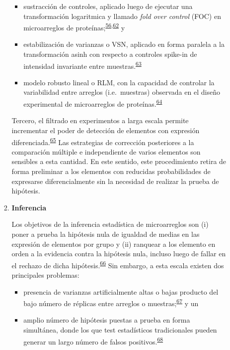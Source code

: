 \documentclass[]{article}
\providecommand{\tightlist}{%
  \setlength{\itemsep}{0pt}\setlength{\parskip}{0pt}}
\begin{document}
\begin{enumerate}
\begin{enumerate}
\begin{enumerate}
      \begin{itemize}
      \tightlist
      \item
        sustracción de controles, aplicado luego de ejecutar una
        transformación logaritmica y llamado \emph{fold over control}
        (FOC) en microarreglos de
        proteínas;\textsuperscript{\protect\hyperlink{ref-King2015FOC}{56},\protect\hyperlink{ref-arevalo2016}{62}}
        y
      \item
        estabilización de varianzas o VSN, aplicado en forma paralela a
        la transformación asinh con respecto a controles spike-in de
        intensidad invariante entre
        muestras.\textsuperscript{\protect\hyperlink{ref-huber2002vsn}{63}}
      \item
        modelo robusto lineal o RLM, con la capacidad de controlar la
        variabilidad entre arreglos (i.e.~muestras) observada en el
        diseño experimental de microarreglos de
        proteínas.\textsuperscript{\protect\hyperlink{ref-sboner2009rlm}{64}}
      \end{itemize}

      Tercero, el filtrado en experimentos a larga escala permite
      incrementar el poder de detección de elementos con expresión
      diferenciada.\textsuperscript{\protect\hyperlink{ref-bourgon2010filter}{65}}
      Las estrategias de corrección posteriores a la comparación
      múltiple e independiente de varios elementos son sensibles a esta
      cantidad. En este sentido, este procedimiento retira de forma
      preliminar a los elementos con reducidas probabilidades de
      expresarse diferencialmente sin la necesidad de realizar la prueba
      de hipótesis.
    \item
      \textbf{Inferencia}

      Los objetivos de la inferencia estadística de microarreglos son
      (i) poner a prueba la hipótesis nula de igualdad de medias en las
      expresión de elementos por grupo y (ii) ranquear a los elemento en
      orden a la evidencia contra la hipótesis nula, incluso luego de
      fallar en el rechazo de dicha
      hipótesis.\textsuperscript{\protect\hyperlink{ref-smyth2004ebayes}{66}}
      Sin embargo, a esta escala existen dos principales problemas:

      \begin{itemize}
      \tightlist
      \item
        presencia de varianzas artificialmente altas o bajas producto
        del bajo número de réplicas entre arreglos o
        muestras;\textsuperscript{\protect\hyperlink{ref-baldi2001cybert}{67}}
        y un
      \item
        amplio número de hipótesis puestas a prueba en forma simultánea,
        donde los que test estadísticos tradicionales pueden generar un
        largo número de falsos
        positivos.\textsuperscript{\protect\hyperlink{ref-kayala2012cyber}{68}}
      \end{itemize}


\end{enumerate}
\end{enumerate}
\end{enumerate}
\end{document}
